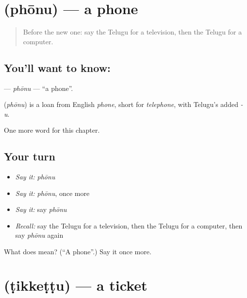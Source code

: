 \section[\texorpdfstring{\te{ఫోను} (phōnu)}{ఫోను (phōnu)}]{ (phōnu) — a phone}

\label{lesson:TE-C130-phonu}



\begin{quote}
Before the new one: say the Telugu for a television, then the Telugu for a computer.
\end{quote}

\subsection*{You'll want to know: }
\textbf{} — \emph{phōnu} — \textquotedblleft{}a phone\textquotedblright{}.

\begin{cousinweb}
\textbf{} (\emph{phōnu}) is a loan from English \emph{phone}, short for \emph{telephone}, with Telugu's added \emph{-u}.
\end{cousinweb}

\begin{grammarlens}[title={What you've built}]
One more word for this chapter.
\end{grammarlens}

\subsection*{Your turn}
\begin{itemize}
\raggedright
  \item \emph{Say it:} \emph{phōnu}
  \item \emph{Say it:} \emph{phōnu}, once more
  \item \emph{Say it:} say \emph{phōnu}
  \item \emph{Recall:} say the Telugu for a television, then the Telugu for a computer, then say \emph{phōnu} again
\end{itemize}

\begin{tcolorbox}[breakable,colback=teal!4,colframe=teal!35!black,title={Before you move on}]
What does  mean? (\textquotedblleft{}A phone\textquotedblright{}.) Say it once more.
\end{tcolorbox}
\section[\texorpdfstring{\te{టిక్కెట్టు} (ṭikkeṭṭu)}{టిక్కెట్టు (ṭikkeṭṭu)}]{ (ṭikkeṭṭu) — a ticket}


